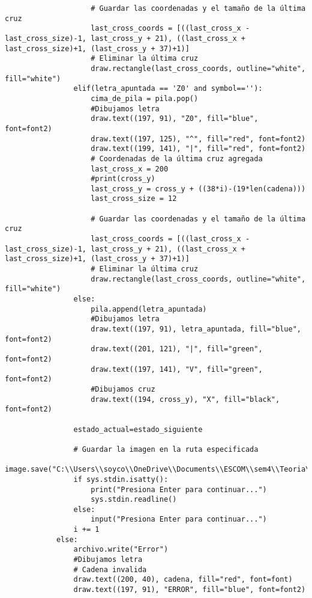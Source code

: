 \begin{enumerate}
\begin{lstlisting}
                    # Guardar las coordenadas y el tamaño de la última cruz
                    last_cross_coords = [((last_cross_x - last_cross_size)-1, last_cross_y + 21), ((last_cross_x + last_cross_size)+1, (last_cross_y + 37)+1)]
                    # Eliminar la última cruz
                    draw.rectangle(last_cross_coords, outline="white", fill="white")
                elif(letra_apuntada == 'Z0' and symbol==''):
                    cima_de_pila = pila.pop()
                    #Dibujamos letra
                    draw.text((197, 91), "Z0", fill="blue", font=font2)
                    draw.text((197, 125), "^", fill="red", font=font2)
                    draw.text((199, 141), "|", fill="red", font=font2)
                    # Coordenadas de la última cruz agregada
                    last_cross_x = 200
                    #print(cross_y)
                    last_cross_y = cross_y + ((38*i)-(19*len(cadena)))
                    last_cross_size = 12

                    # Guardar las coordenadas y el tamaño de la última cruz
                    last_cross_coords = [((last_cross_x - last_cross_size)-1, last_cross_y + 21), ((last_cross_x + last_cross_size)+1, (last_cross_y + 37)+1)]
                    # Eliminar la última cruz
                    draw.rectangle(last_cross_coords, outline="white", fill="white")
                else:
                    pila.append(letra_apuntada)
                    #Dibujamos letra
                    draw.text((197, 91), letra_apuntada, fill="blue", font=font2)
                    draw.text((201, 121), "|", fill="green", font=font2)
                    draw.text((197, 141), "V", fill="green", font=font2)
                    #Dibujamos cruz
                    draw.text((194, cross_y), "X", fill="black", font=font2)
                    
                estado_actual=estado_siguiente
                
                # Guardar la imagen en la ruta especificada
                image.save("C:\\Users\\soyco\\OneDrive\\Documents\\ESCOM\\sem4\\Teoria\\P2\\Prog4\\output\\animacion.png")
                if sys.stdin.isatty():
                    print("Presiona Enter para continuar...")
                    sys.stdin.readline()
                else:
                    input("Presiona Enter para continuar...")
                i += 1
            else:
                archivo.write("Error")
                #Dibujamos letra
                # Cadena invalida
                draw.text((200, 40), cadena, fill="red", font=font) 
                draw.text((197, 91), "ERROR", fill="blue", font=font2)
                

\end{lstlisting}
\end{enumerate}
